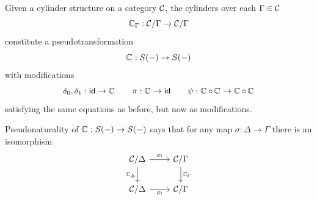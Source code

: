 \begin{proposition}
  Given a cylinder structure on a category $\CC$,
  the cylinders over each $\Gamma \in \CC$
  \[\cyl[\Gamma] : \CC / \Gamma \to \CC / \Gamma\]
  constitute a pseudotransformation
  \[ {\cyl} : S (-) \to S (-) \]
  with modifications
  \[\delta_0, \delta_1 : \id \to {\cyl}
  \quad \quad
  \pi : {\cyl} \to \id
  \quad \quad 
  \psi : \cyl \circ \cyl \to \cyl \circ \cyl\]
   satisfying the same equations as before,
   but now as modifications.
\end{proposition}

Pseudonaturality of ${\cyl} : S(-) \to S(-)$ says that for any
map $\sigma : \Delta \to \Gamma$ there is an isomorphism
\begin{equation}\label{eq:frobenius-identity}
\begin{tikzcd}
	{\CC / \Delta} & {\CC / \Gamma} \\
	{\CC / \Delta} & {\CC / \Gamma}
	\arrow["{\sigma_!}", from=1-1, to=1-2]
  \arrow["{\cyl[\Delta]}"', from=1-1, to=2-1]
  \arrow["{\cyl[\Gamma]}", from=1-2, to=2-2]
	\arrow["{\sigma_!}"', from=2-1, to=2-2]
\end{tikzcd} \end{equation}

